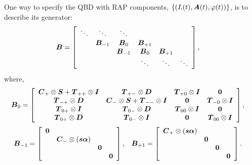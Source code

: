 One way to specify the QBD with RAP components, \(\left\{(L(t),\boldsymbol A(t),{\varphi}(t))\right\}\), is to describe its generator:
\begin{align*}
\boldsymbol{B} &= \left[\begin{array}{cccccc}
 \ddots & \ddots & \ddots & & & \\
 & \boldsymbol{B}_{-1} & \boldsymbol{B}_0 & \boldsymbol{B}_{+1} & & \\ 
 & &  \boldsymbol{B}_{-1} & \boldsymbol{B}_0 & \boldsymbol{B}_{+1} & \\
 & & & \ddots & \ddots & \ddots 
\end{array}\right],
\end{align*}
{where,}
\begin{align*}
\boldsymbol{B}_{0} &= \left[\begin{array}{cccc}
	\boldsymbol{C}_+\otimes \boldsymbol{S} + \boldsymbol{T}_{++}\otimes \boldsymbol{I} & \boldsymbol{T}_{+-}\otimes \boldsymbol{D} & \boldsymbol{T}_{+0}\otimes \boldsymbol{I} & \boldsymbol 0 \\
	\boldsymbol{T}_{-+}\otimes \boldsymbol{D} & \boldsymbol{C}_-\otimes \boldsymbol{S} + \boldsymbol{T}_{--}\otimes \boldsymbol{I} & \boldsymbol 0 & \boldsymbol{T}_{-0}\otimes \boldsymbol{I} \\
	\boldsymbol{T}_{0+}\otimes \boldsymbol{I} & \boldsymbol{T}_{0-}\otimes \boldsymbol{D} & \boldsymbol{T}_{00}\otimes \boldsymbol{I} & \boldsymbol 0 \\
	\boldsymbol{T}_{0+}\otimes \boldsymbol{D} & \boldsymbol{T}_{0-}\otimes \boldsymbol{I} & \boldsymbol 0 & \boldsymbol{T}_{00}\otimes \boldsymbol{I}
	\end{array}\right],
\end{align*}
\begin{align*}
\bs{B}_{-1} &= \left[\begin{array}{cccc}
	\bs 0 & & & \\
	& \bs{C}_-\otimes (\bs s\bs\alpha) & & \\
	& & \bs 0 & \\ 
	& & & \bs 0
	\end{array}\right],
%
&& \bs{B}_{+1} = \left[\begin{array}{cccc}
	\bs{C}_+\otimes (\bs s\bs\alpha) & & & \\
	& \bs 0 & & \\
	& & \bs 0 & \\ 
	& & & \bs 0
	\end{array}\right].
\end{align*}

